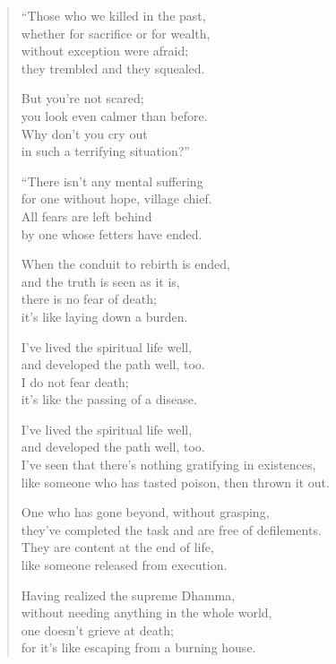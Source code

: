 \documentclass[12pt,openany]{book}%
\begin{document}
\begin{verse}%
“Those who we killed in the past, \\
whether for sacrifice or for wealth, \\
without exception were afraid; \\
they trembled and they squealed. 

But you’re not scared; \\
you look even calmer than before. \\
Why don’t you cry out \\
in such a terrifying situation?” 

“There isn’t any mental suffering \\
for one without hope, village chief. \\
All fears are left behind \\
by one whose fetters have ended. 

When the conduit to rebirth is ended, \\
and the truth is seen as it is, \\
there is no fear of death; \\
it’s like laying down a burden. 

I’ve lived the spiritual life well, \\
and developed the path well, too. \\
I do not fear death; \\
it’s like the passing of a disease. 

I’ve lived the spiritual life well, \\
and developed the path well, too. \\
I’ve seen that there’s nothing gratifying in existences, \\
like someone who has tasted poison, then thrown it out. 

One who has gone beyond, without grasping, \\
they’ve completed the task and are free of defilements. \\
They are content at the end of life, \\
like someone released from execution. 

Having realized the supreme Dhamma, \\
without needing anything in the whole world, \\
one doesn’t grieve at death; \\
for it’s like escaping from a burning house. 


\end{verse}
\end{document}
